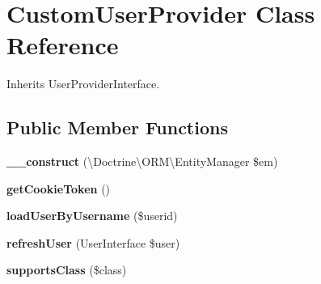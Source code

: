 \hypertarget{class_site_1_1_trail_bundle_1_1_security_1_1_custom_user_provider}{}\section{Custom\+User\+Provider Class Reference}
\label{class_site_1_1_trail_bundle_1_1_security_1_1_custom_user_provider}


Inherits User\+Provider\+Interface.

\subsection*{Public Member Functions}
\begin{DoxyCompactItemize}
\item 
\hypertarget{class_site_1_1_trail_bundle_1_1_security_1_1_custom_user_provider_ab2169482dc28d8878073284ee38f2aa2}{}{\bfseries \+\_\+\+\_\+construct} (\textbackslash{}Doctrine\textbackslash{}\+O\+R\+M\textbackslash{}\+Entity\+Manager \$em)\label{class_site_1_1_trail_bundle_1_1_security_1_1_custom_user_provider_ab2169482dc28d8878073284ee38f2aa2}

\item 
\hypertarget{class_site_1_1_trail_bundle_1_1_security_1_1_custom_user_provider_adc920bf22fb774486c7373ba9eb5fde8}{}{\bfseries get\+Cookie\+Token} ()\label{class_site_1_1_trail_bundle_1_1_security_1_1_custom_user_provider_adc920bf22fb774486c7373ba9eb5fde8}

\item 
\hypertarget{class_site_1_1_trail_bundle_1_1_security_1_1_custom_user_provider_a8a134d072a2f3efff483fb9e97647fe1}{}{\bfseries load\+User\+By\+Username} (\$userid)\label{class_site_1_1_trail_bundle_1_1_security_1_1_custom_user_provider_a8a134d072a2f3efff483fb9e97647fe1}

\item 
\hypertarget{class_site_1_1_trail_bundle_1_1_security_1_1_custom_user_provider_aaa9b45a480336cc76cccd7211c5897a2}{}{\bfseries refresh\+User} (User\+Interface \$user)\label{class_site_1_1_trail_bundle_1_1_security_1_1_custom_user_provider_aaa9b45a480336cc76cccd7211c5897a2}

\item 
\hypertarget{class_site_1_1_trail_bundle_1_1_security_1_1_custom_user_provider_afdff6bbfde26b09a76d382483faf698b}{}{\bfseries supports\+Class} (\$class)\label{class_site_1_1_trail_bundle_1_1_security_1_1_custom_user_provider_afdff6bbfde26b09a76d382483faf698b}

\end{DoxyCompactItemize}
